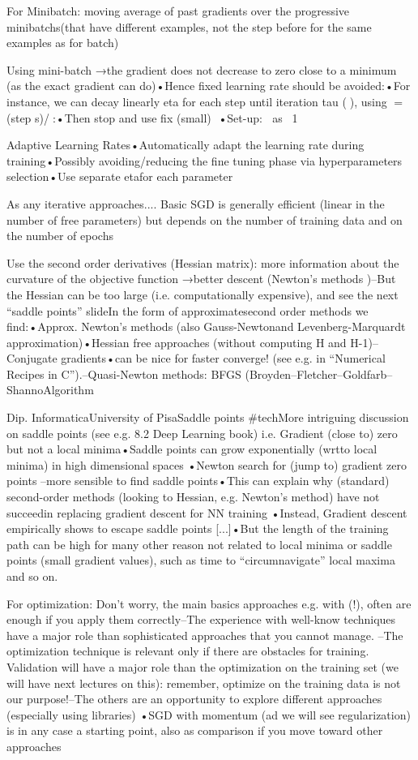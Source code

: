 For Minibatch: moving average of past gradients over the progressive minibatchs(that have different examples, not the step before for the same examples as for batch)

Using mini-batch →the gradient does not decrease to zero close to a minimum (as the exact gradient can do)•Hence fixed learning rate should be avoided:•For instance, we can  decay linearly eta for each step until iteration tau (), using =(step s)/:•Then stop and use fix (small) •Set-up: as ~1%

Adaptive Learning Rates•Automatically adapt the learning rate during training•Possibly avoiding/reducing the fine tuning phase via hyperparameters selection•Use separate etafor each parameter

As any iterative approaches.... Basic SGD is generally efficient (linear in the number of free parameters)  but depends on the number of training data and on the number of epochs

Use the second order derivatives (Hessian matrix): more information about the curvature of the objective function →better descent (Newton's methods )–But the Hessian can be too large (i.e. computationally expensive), and see the next “saddle points” slideIn the form of approximatesecond order methods we find:•Approx. Newton's methods (also Gauss-Newtonand Levenberg-Marquardt  approximation)•Hessian free approaches (without computing H and H-1)–Conjugate gradients•can be nice for faster converge! (see e.g. in “Numerical Recipes in C”).–Quasi-Newton methods: BFGS (Broyden–Fletcher–Goldfarb–ShannoAlgorithm

Dip. InformaticaUniversity of PisaSaddle points #techMore intriguing discussion on saddle points (see e.g. 8.2 Deep Learning book) i.e. Gradient (close to) zero but not a local minima•Saddle points can grow exponentially (wrtto local minima) in high dimensional spaces •Newton search for (jump to) gradient zero points –more sensible to find saddle points•This can explain why (standard) second-order methods (looking to Hessian, e.g. Newton’s method) have not succeedin replacing gradient descent for NN training •Instead, Gradient descent empirically shows to escape saddle points [...]•But the length of the training path can be high for many other reason not related to local minima or saddle points (small gradient values), such as time to “circumnavigate” local maxima and so on.

For optimization: Don’t worry, the main basics approaches e.g. with (!), often are enough if you apply them correctly–The experience with well-know techniques have a major role than sophisticated approaches that you cannot manage. –The optimization technique is relevant only if there are obstacles for training. Validation will have a major role than the optimization on the training set (we will have next lectures on this): remember, optimize on the training data is not our purpose!–The others are an opportunity to explore different approaches (especially using libraries) •SGD with momentum (ad we will see regularization) is in any case a starting point, also as comparison if you move toward other approaches

